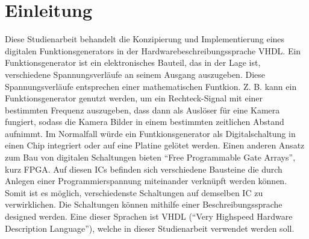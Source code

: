 \chapter[Einleitung]{Einleitung\raisebox{.3\baselineskip}{\normalsize \footnotemark}}

Diese Studienarbeit behandelt die Konzipierung und Implementierung eines
digitalen Funktionsgenerators in der Hardwarebeschreibungssprache VHDL.
Ein Funktionsgenerator ist ein elektronisches Bauteil, das in der Lage ist,
verschiedene Spannungsverläufe an seinem Ausgang auszugeben. Diese
Spannungsverläufe entsprechen einer mathematischen Funtkion. Z. B. kann ein
Funktionsgenerator genutzt werden, um ein Rechteck-Signal mit einer bestimmten
Frequenz auszugeben, dass dann als Auslöser für eine Kamera fungiert, sodass die Kamera Bilder in einem bestimmten zeitlichen Abstand aufnimmt.
Im Normalfall würde ein Funtkionsgenerator als Digitalschaltung in einen Chip
integriert oder auf eine Platine gelötet werden. Einen anderen Ansatz zum Bau
von digitalen Schaltungen bieten ``Free Programmable Gate Arrays'', kurz FPGA.
Auf diesen ICs befinden sich verschiedene Bausteine die durch Anlegen einer
Programmierspannung miteinander verknüpft werden können. Somit ist es möglich,
verschiedenste Schaltungen auf demselben IC zu verwirklichen. Die Schaltungen
können mithilfe einer Beschreibungssprache designed werden. Eine dieser Sprachen
ist VHDL (``Very Highspeed Hardware Description Language''), welche in dieser
Studienarbeit verwendet werden soll. 

